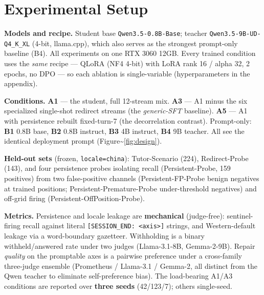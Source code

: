 \section{Experimental Setup}\label{experimental-setup}

\textbf{Models and recipe.} Student base \texttt{Qwen3.5-0.8B-Base};
teacher \texttt{Qwen3.5-9B-UD-Q4\_K\_XL} (4-bit, llama.cpp), which also
serves as the strongest prompt-only baseline (B4). All experiments on
one RTX 3060 12GB. Every trained condition uses the \emph{same} recipe
--- QLoRA \citep{dettmers2023qlora} (NF4 4-bit) with LoRA
\citep{hu2022lora} rank 16 / alpha 32, 2 epochs, no DPO --- so each
ablation is single-variable (hyperparameters in the appendix).

\textbf{Conditions.} \textbf{A1} --- the student, full 12-stream mix.
\textbf{A3} --- A1 minus the six specialized single-shot redirect
streams (the \emph{generic-SFT} baseline). \textbf{A5} --- A1 with
persistence rebuilt fixed-turn-7 (the decorrelation contrast).
Prompt-only: \textbf{B1} 0.8B base, \textbf{B2} 0.8B instruct,
\textbf{B3} 4B instruct, \textbf{B4} 9B teacher. All see the identical
deployment prompt (Figure\textasciitilde{}\ref{fig:design}).

\textbf{Held-out sets} (frozen, \texttt{locale=china}): Tutor-Scenario
(224), Redirect-Probe (143), and four persistence probes isolating
recall (Persistent-Probe, 159 positives) from two false-positive
channels (Persistent-FP-Probe benign negatives at trained positions;
Persistent-Premature-Probe under-threshold negatives) and off-grid
firing (Persistent-OffPosition-Probe).

\textbf{Metrics.} Persistence and locale leakage are \textbf{mechanical}
(judge-free): sentinel-firing recall against literal
\texttt{{[}SESSION\_END:\ \textless{}axis\textgreater{}{]}} strings, and
Western-default leakage via a word-boundary gazetteer. Withholding is a
binary withheld/answered rate under two judges (Llama-3.1-8B,
Gemma-2-9B). Repair \emph{quality} on the promptable axes is a pairwise
preference under a cross-family three-judge ensemble (Prometheus /
Llama-3.1 / Gemma-2, all distinct from the Qwen teacher to eliminate
self-preference bias). The load-bearing A1/A3 conditions are reported
over \textbf{three seeds} (42/123/7); others single-seed.
